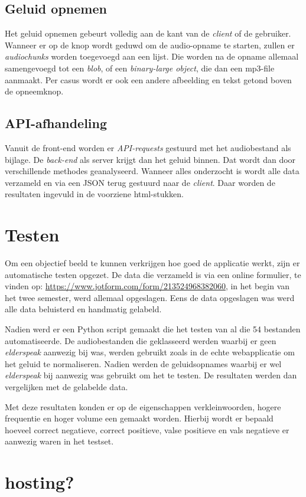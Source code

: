 \subsection{Geluid opnemen}
Het geluid opnemen gebeurt volledig aan de kant van de \textit{client} of de gebruiker. Wanneer er op de knop wordt geduwd om de audio-opname te starten, zullen er \textit{audiochunks } worden toegevoegd aan een lijst. Die worden na de opname allemaal samengevoegd tot een \textit{blob}, of een \textit{binary-large object}, die dan een mp3-file aanmaakt.
Per casus wordt er ook een andere afbeelding en tekst getond boven de opneemknop.

\subsection{API-afhandeling}
Vanuit de front-end worden er \textit{API-requests} gestuurd met het audiobestand als bijlage. De \textit{back-end} als server krijgt dan het geluid binnen. Dat wordt dan door verschillende methodes geanalyseerd. Wanneer alles onderzocht is wordt alle data verzameld en via een JSON terug gestuurd naar de \textit{client}. Daar worden de resultaten ingevuld in de voorziene html-stukken.


\section{Testen}
Om een objectief beeld te kunnen verkrijgen hoe goed de applicatie werkt, zijn er automatische testen opgezet. De data die verzameld is via een online formulier, te vinden op:  \url{https://www.jotform.com/form/213524968382060}, in het begin van het twee semester, werd allemaal opgeslagen. Eens de data opgeslagen was werd alle data beluisterd en handmatig gelabeld.

Nadien werd er een Python script gemaakt die het testen van al die 54 bestanden automatiseerde. De audiobestanden die geklasseerd werden waarbij er geen \textit{elderspeak} aanwezig bij was, werden gebruikt zoals in de echte webapplicatie om het geluid te normaliseren. Nadien werden de geluidsopnames waarbij er wel \textit{elderspeak} bij aanwezig was gebruikt om het te testen. De resultaten werden dan vergelijken met de gelabelde data.

Met deze resultaten konden er op de eigenschappen verkleinwoorden, hogere frequentie en hoger volume een  gemaakt worden. Hierbij wordt er bepaald hoeveel correct negatieve, correct positieve, valse positieve en vals negatieve er aanwezig waren in het testset.

\section{hosting?}

